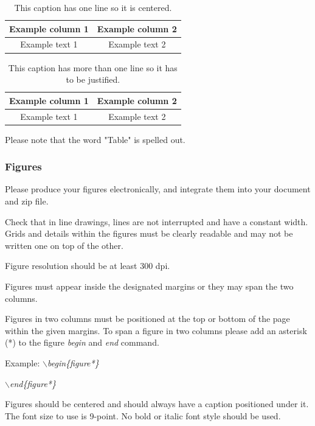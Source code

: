 \documentclass[a4paper,twoside]{article}
\begin{document}
\begin{table}[h]
\caption{This caption has one line so it is
centered.}\label{tab:example1} \centering
\begin{tabular}{|c|c|}
  \hline
  Example column 1 & Example column 2 \\
  \hline
  Example text 1 & Example text 2 \\
  \hline
\end{tabular}
\end{table}

\begin{table}[h]
\vspace{-0.2cm}
\caption{This caption has more than one line so it has to be
justified.}\label{tab:example2} \centering
\begin{tabular}{|c|c|}
  \hline
  Example column 1 & Example column 2 \\
  \hline
  Example text 1 & Example text 2 \\
  \hline
\end{tabular}
\end{table}

Please note that the word "Table" is spelled out.


\subsubsection{Figures}

Please produce your figures electronically, and integrate them into
your document and zip file.

Check that in line drawings, lines are not interrupted and have a
constant width. Grids and details within the figures must be clearly
readable and may not be written one on top of the other.

Figure resolution should be at least 300 dpi.

Figures must appear inside the designated margins or they may span
the two columns.

Figures in two columns must be positioned at the top or bottom of
the page within the given margins. To span a figure in two columns please add an asterisk (*) to the figure \textit{begin} and \textit{end} command.

Example: \textit{$\backslash$begin\{figure*\}}

\hspace*{1.5cm}\textit{$\backslash$end\{figure*\}}

Figures should be centered and should always have a caption
positioned under it. The font size to use is 9-point. No bold or
italic font style should be used.
\end{document}
